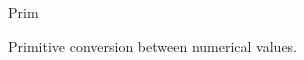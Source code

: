\begin{pattern}{Prim}

Primitive conversion between numerical values.

\instances
    
\end{pattern}